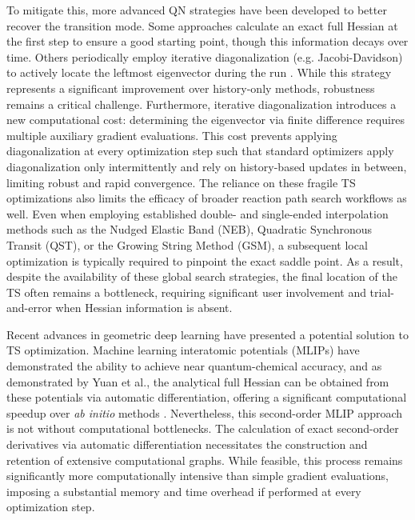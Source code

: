 \documentclass[12pt]{article}
\begin{document}
To mitigate this, more advanced QN strategies have been developed to better recover the transition mode. Some approaches calculate an exact full Hessian at the first step to ensure a good starting point, though this information decays over time. Others periodically employ iterative diagonalization (e.g. Jacobi-Davidson) to actively locate the leftmost eigenvector during the run \cite{jd1, jd2, jd3, jd4, Sella2}. While this strategy represents a significant improvement over history-only methods, robustness remains a critical challenge. Furthermore, iterative diagonalization introduces a new computational cost: determining the eigenvector via finite difference requires multiple auxiliary gradient evaluations. This cost prevents applying diagonalization at every optimization step such that standard optimizers apply diagonalization only intermittently and rely on history-based updates in between, limiting robust and rapid convergence. The reliance on these fragile TS optimizations also limits the efficacy of broader reaction path search workflows as well. Even when employing established double- and single-ended interpolation methods such as the Nudged Elastic Band (NEB)\cite{neb1, neb2}, Quadratic Synchronous Transit (QST)\cite{qst}, or the Growing String Method (GSM)\cite{gsm}, a subsequent local optimization is typically required to pinpoint the exact saddle point. As a result, despite the availability of these global search strategies, the final location of the TS often remains a bottleneck, requiring significant user involvement and trial-and-error when Hessian information is absent.\par

Recent advances in geometric deep learning have presented a potential solution to TS optimization. Machine learning interatomic potentials (MLIPs) have demonstrated the ability to achieve near quantum-chemical accuracy, and as demonstrated by Yuan et al., the analytical full Hessian can be obtained from these potentials via automatic differentiation, offering a significant computational speedup over \textit{ab initio} methods \cite{Yuan2024}. Nevertheless, this second-order MLIP approach is not without computational bottlenecks. The calculation of exact second-order derivatives via automatic differentiation necessitates the construction and retention of extensive computational graphs. While feasible, this process remains significantly more computationally intensive than simple gradient evaluations, imposing a substantial memory and time overhead if performed at every optimization step.\par
\end{document}
